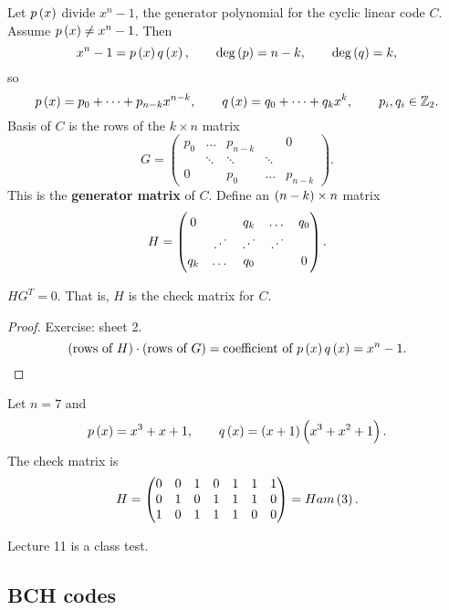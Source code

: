 Let $ p\br{x} $ divide $ x^n - 1 $, the generator polynomial for the cyclic linear code $ C $. Assume $ p\br{x} \ne x^n - 1 $. Then
$$ x^n - 1 = p\br{x}q\br{x}, \qquad \deg\br{p} = n - k, \qquad \deg\br{q} = k, $$
so
$$ p\br{x} = p_0 + \dots + p_{n - k}x^{n - k}, \qquad q\br{x} = q_0 + \dots + q_kx^k, \qquad p_i, q_i \in \Z_2. $$
Basis of $ C $ is the rows of the $ k \times n $ matrix
$$ G =
\begin{pmatrix}
p_0 & \dots & p_{n - k} & & 0 \\
& \ddots & \ddots & \ddots & \\
0 & & p_0 & \dots & p_{n - k}
\end{pmatrix}.
$$
This is the \textbf{generator matrix} of $ C $. Define an $ \br{n - k} \times n $ matrix
$$ H =
\begin{pmatrix}
0 & & q_k & \dots & q_0 \\
& \reflectbox{$ \ddots $} & \reflectbox{$ \ddots $} & \reflectbox{$ \ddots $} & \\
q_k & \dots & q_0 & & 0
\end{pmatrix}.
$$

\begin{proposition}
$ HG^T = 0 $. That is, $ H $ is the check matrix for $ C $.
\end{proposition}

\begin{proof}
Exercise: sheet 2.
$$ \br{\text{rows of} \ H} \cdot \br{\text{rows of} \ G} = \text{coefficient of} \ p\br{x}q\br{x} = x^n - 1. $$
\end{proof}

\begin{example*}
Let $ n = 7 $ and
$$ p\br{x} = x^3 + x + 1, \qquad q\br{x} = \br{x + 1}\br{x^3 + x^2 + 1}. $$
The check matrix is
$$ H =
\begin{pmatrix}
0 & 0 & 1 & 0 & 1 & 1 & 1 \\
0 & 1 & 0 & 1 & 1 & 1 & 0 \\
1 & 0 & 1 & 1 & 1 & 0 & 0
\end{pmatrix}
= Ham\br{3}. $$
\end{example*}


Lecture 11 is a class test.

\pagebreak

\subsection{BCH codes}

